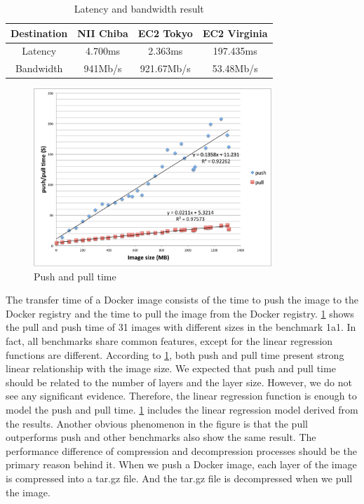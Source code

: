 \documentclass{ieicej}
\begin{document}
\begin{table}[ht]
  \begin{tabular}{|c|c|c|c|}
    \hline
    Destination & NII Chiba      & EC2 Tokyo    & EC2 Virginia \\
    \hline
    Latency     & 4.700ms        & 2.363ms      & 197.435ms \\
    \hline
    Bandwidth   & 941Mb/s        & 921.67Mb/s   & 53.48Mb/s \\
    \hline
  \end{tabular}
  \caption{Latency and bandwidth result}
  \label{lat_band}
\end{table}


\begin{figure}[ht]
  \begin{center}
  \includegraphics[width=0.8\textwidth,natwidth=1000,natheight=800]{4_push_and_pull_time.pdf}
  \end{center}
  \caption{Push and pull time}
  \label{ppt}
\end{figure}

The transfer time of a Docker image consists of the time to push the image to the Docker registry and the time to pull the image from the Docker registry.
\cref{ppt} shows the pull and push time of 31 images with different sizes in the benchmark 1a1.
In fact, all benchmarks share common features, except for the linear regression functions are different.
According to \cref{ppt}, both push and pull time present strong linear relationship with the image size.
We expected that push and pull time should be related to the number of layers and the layer size.
However, we do not see any significant evidence. Therefore, the linear regression function is enough to model the push and pull time.
\cref{ppt} includes the linear regression model derived from the results. Another obvious phenomenon in the figure is that the pull outperforms push and other benchmarks also show the same result.
The performance difference of compression and decompression processes should be the primary reason behind it.
When we push a Docker image, each layer of the image is compressed into a tar.gz file.
And the tar.gz file is decompressed when we pull the image.
\end{document}
